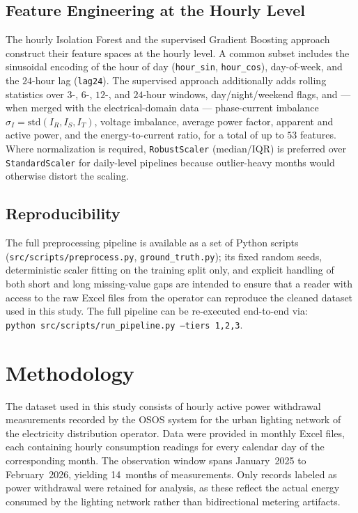 \documentclass{article}
\begin{document}
\subsection{Feature Engineering at the Hourly Level}
The hourly Isolation Forest and the supervised Gradient Boosting approach construct their feature spaces at the hourly level. A common subset includes the sinusoidal encoding of the hour of day (\texttt{hour\_sin}, \texttt{hour\_cos}), day-of-week, and the $24$-hour lag (\texttt{lag24}). The supervised approach additionally adds rolling statistics over $3$-, $6$-, $12$-, and $24$-hour windows, day/night/weekend flags, and --- when merged with the electrical-domain data --- phase-current imbalance $\sigma_I = \mathrm{std}(I_R, I_S, I_T)$, voltage imbalance, average power factor, apparent and active power, and the energy-to-current ratio, for a total of up to $53$ features. Where normalization is required, \texttt{RobustScaler} (median/IQR) is preferred over \texttt{StandardScaler} for daily-level pipelines because outlier-heavy months would otherwise distort the scaling.

\subsection{Reproducibility}
The full preprocessing pipeline is available as a set of Python scripts (\texttt{src/scripts/preprocess.py}, \texttt{ground\_truth.py}); its fixed random seeds, deterministic scaler fitting on the training split only, and explicit handling of both short and long missing-value gaps are intended to ensure that a reader with access to the raw Excel files from the operator can reproduce the cleaned dataset used in this study. The full pipeline can be re-executed end-to-end via:\\
\texttt{python src/scripts/run\_pipeline.py --tiers 1,2,3}.

\section{Methodology}
The dataset used in this study consists of hourly active power
withdrawal measurements recorded by the OSOS system for the urban
lighting network of the electricity distribution operator. Data were
provided in monthly Excel files, each containing hourly consumption
readings for every calendar day of the corresponding month. The
observation window spans January~2025 to February~2026, yielding
14~months of measurements. Only records labeled as power withdrawal
were retained for analysis, as these reflect the actual energy
consumed by the lighting network rather than bidirectional metering
artifacts.
\end{document}
